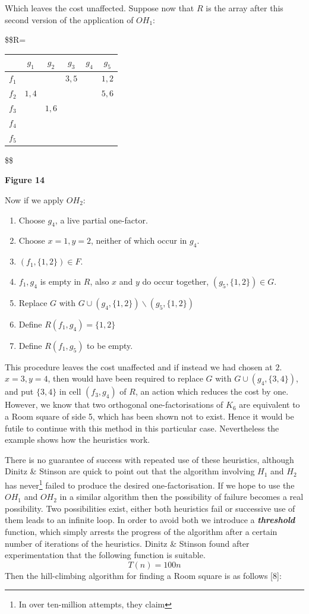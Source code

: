 \documentclass[
  12pt,
  a4paper]{book}
\begin{document}
Which leaves the cost unaffected. Suppose now that \(R\) is the array
after this second version of the application of \(OH_1\):

\$\$R=

\begin{longtable}[]{@{}lccccc@{}}
\toprule
& \(g_1\) & \(g_2\) & \(g_3\) & \(g_4\) & \(g_5\)\tabularnewline
\midrule
\endhead
\(f_1\) & & & \(3,5\) & & \(1,2\)\tabularnewline
\(f_2\) & \(1,4\) & & & & \(5,6\)\tabularnewline
\(f_3\) & & \(1,6\) & & &\tabularnewline
\(f_4\) & & & & &\tabularnewline
\(f_5\) & & & & &\tabularnewline
\bottomrule
\end{longtable}

\$\$

\textbf{Figure 14}

Now if we apply \(OH_2\):

\begin{enumerate}
\def\labelenumi{\arabic{enumi}.}
\item
  Choose \(g_4\), a live partial one-factor.
\item
  Choose \(x=1, y=2\), neither of which occur in \(g_4\).
\item
  \((f_1,\{1,2\}) \in F\).
\item
  \(f_1,g_4\) is empty in \(R\), also \(x\) and \(y\) do occur together,
  \((g_5,\{1,2\}) \in G\).
\item
  Replace \(G\) with \(G \cup (g_4,\{1,2\}) \backslash (g_5,\{1,2\})\)
\item
  Define \(R(f_1,g_4)=\{1,2\}\)
\item
  Define \(R(f_1,g_5)\) to be empty.
\end{enumerate}

This procedure leaves the cost unaffected and if instead we had chosen
at \(2\). \(x=3,y=4\), then would have been required to replace \(G\)
with \(G \cup (g_4,\{3,4\})\), and put \(\{3,4\}\) in cell \((f_3,g_4)\)
of \(R\), an action which reduces the cost by one. However, we know that
two orthogonal one-factorisations of \(K_6\) are equivalent to a Room
square of side 5, which has been shown not to exist. Hence it would be
futile to continue with this method in this particular case.
Nevertheless the example shows how the heuristics work.

There is no guarantee of success with repeated use of these heuristics,
although Dinitz \& Stinson are quick to point out that the algorithm
involving \(H_1\) and \(H_2\) has never\footnote{In over ten-million
  attempts, they claim} failed to produce the desired one-factorisation.
If we hope to use the \(OH_1\) and \(OH_2\) in a similar algorithm then
the possibility of failure becomes a real possibility. Two possibilities
exist, either both heuristics fail or successive use of them leads to an
infinite loop. In order to avoid both we introduce a
\textbf{\emph{threshold}} function, which simply arrests the progress of
the algorithm after a certain number of iterations of the heuristics.
Dinitz \& Stinson found after experimentation that the following
function is suitable. \[T(n)=100n\] Then the hill-climbing algorithm for
finding a Room square is as follows {[}8{]}:
\end{document}
